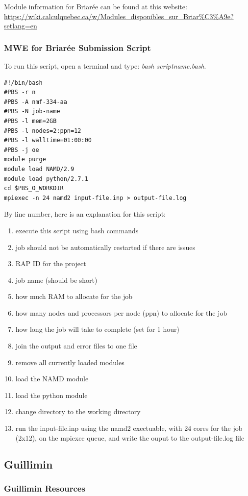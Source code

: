 \documentclass[12pt]{article}
\begin{document}
\quad Module information for Briar\'{e}e can be found at this website: \url{https://wiki.calculquebec.ca/w/Modules_disponibles_sur_Briar%C3%A9e?setlang=en}

\subsubsection{MWE for Briar\'{e}e Submission Script}
\quad To run this script, open a terminal and type: \textit{bash scriptname.bash}. 
\begin{lstlisting}
#!/bin/bash
#PBS -r n
#PBS -A nmf-334-aa
#PBS -N job-name
#PBS -l mem=2GB
#PBS -l nodes=2:ppn=12
#PBS -l walltime=01:00:00
#PBS -j oe
module purge
module load NAMD/2.9
module load python/2.7.1
cd $PBS_O_WORKDIR
mpiexec -n 24 namd2 input-file.inp > output-file.log
\end{lstlisting}

\quad By line number, here is an explanation for this script:

\begin{enumerate}
\item execute this script using bash commands
\item job should not be automatically restarted if there are issues
\item RAP ID for the project
\item job name (should be short)
\item how much RAM to allocate for the job
\item how many nodes and processors per node (ppn) to allocate for the job
\item how long the job will take to complete (set for 1 hour)
\item join the output and error files to one file
\item remove all currently loaded modules
\item load the NAMD module
\item load the python module
\item change directory to the working directory
\item run the input-file.inp using the namd2 exectuable, with 24 cores for the job (2x12), on the mpiexec queue, and write the ouput to the output-file.log file
\end{enumerate}

\subsection{Guillimin}
\subsubsection{Guillimin Resources}
\end{document}
